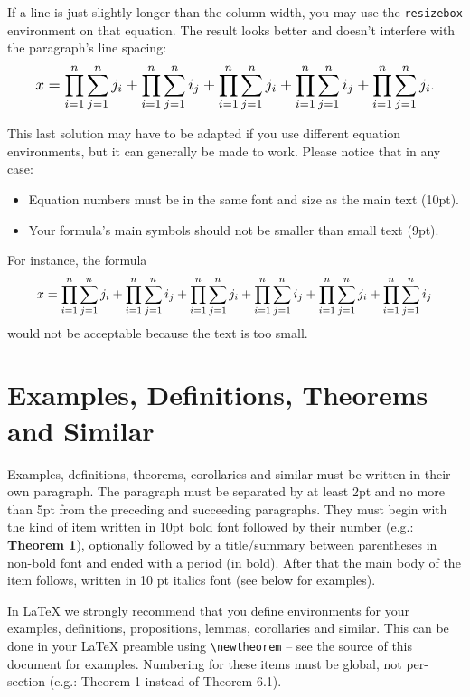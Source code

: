\documentclass{article}
\begin{document}
If a line is just slightly longer than the column width, you may use the {\tt resizebox} environment on that equation. The result looks better and doesn't interfere with the paragraph's line spacing: %
\begin{equation}
    \resizebox{.91\linewidth}{!}{$
            \displaystyle
            x = \prod_{i=1}^n \sum_{j=1}^n j_i + \prod_{i=1}^n \sum_{j=1}^n i_j + \prod_{i=1}^n \sum_{j=1}^n j_i + \prod_{i=1}^n \sum_{j=1}^n i_j + \prod_{i=1}^n \sum_{j=1}^n j_i
        $}.
\end{equation}%

This last solution may have to be adapted if you use different equation environments, but it can generally be made to work. Please notice that in any case:

\begin{itemize}
    \item Equation numbers must be in the same font and size as the main text (10pt).
    \item Your formula's main symbols should not be smaller than {\small small} text (9pt).
\end{itemize}

For instance, the formula
%
\begin{equation}
    \resizebox{.91\linewidth}{!}{$
            \displaystyle
            x = \prod_{i=1}^n \sum_{j=1}^n j_i + \prod_{i=1}^n \sum_{j=1}^n i_j + \prod_{i=1}^n \sum_{j=1}^n j_i + \prod_{i=1}^n \sum_{j=1}^n i_j + \prod_{i=1}^n \sum_{j=1}^n j_i + \prod_{i=1}^n \sum_{j=1}^n i_j
        $}
\end{equation}
%
would not be acceptable because the text is too small.

\section{Examples, Definitions, Theorems and Similar}

Examples, definitions, theorems, corollaries and similar must be written in their own paragraph. The paragraph must be separated by at least 2pt and no more than 5pt from the preceding and succeeding paragraphs. They must begin with the kind of item written in 10pt bold font followed by their number (e.g.: {\bf Theorem 1}),
optionally followed by a title/summary between parentheses in non-bold font and ended with a period (in bold).
After that the main body of the item follows, written in 10 pt italics font (see below for examples).

In \LaTeX{} we strongly recommend that you define environments for your examples, definitions, propositions, lemmas, corollaries and similar. This can be done in your \LaTeX{} preamble using \texttt{\textbackslash{newtheorem}} -- see the source of this document for examples. Numbering for these items must be global, not per-section (e.g.: Theorem 1 instead of Theorem 6.1).
\end{document}

